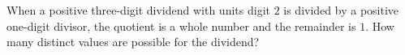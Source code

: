 When a positive three-digit dividend with units digit $2$ is divided by a positive one-digit divisor, the quotient is a whole number and the remainder is $1$. How many distinct values are possible for the dividend?
